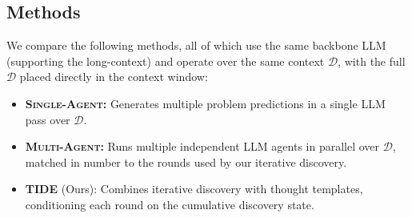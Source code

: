 \documentclass{llmxive}
\begin{document}
\subsection{Methods}
We compare the following methods, all of which use the same backbone LLM (supporting the long-context) and operate over the same context $\mathcal{D}$, with the full $\mathcal{D}$ placed directly in the context window:

\begin{itemize}[leftmargin=*]
    \item \textbf{\textsc{Single-Agent:}} Generates multiple problem predictions in a single LLM pass over $\mathcal{D}$.
    \item \textbf{\textsc{Multi-Agent:}} Runs multiple independent LLM agents in parallel over $\mathcal{D}$, matched in number to the rounds used by our iterative discovery.
    \item \textbf{\textsc{TIDE}} (Ours): Combines iterative discovery with thought templates, conditioning each round on the cumulative discovery state.
\end{itemize}
\end{document}
